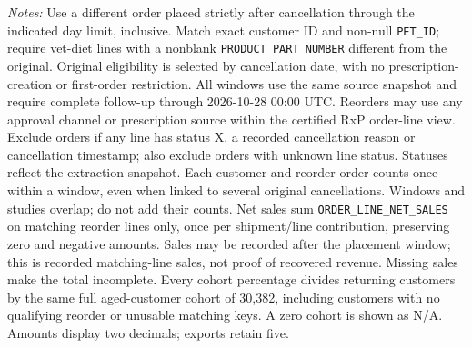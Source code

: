 \begin{table}[!htbp]
\begin{minipage}{\linewidth}
\footnotesize
\textit{Notes:} Use a different order placed strictly after cancellation through the indicated day limit, inclusive. Match exact customer ID and non-null \texttt{PET\_ID}; require vet-diet lines with a nonblank \texttt{PRODUCT\_PART\_NUMBER} different from the original. Original eligibility is selected by
cancellation date, with no prescription-creation or first-order restriction.
All windows use the same source snapshot and require complete follow-up through
2026-10-28 00:00 UTC. Reorders may use any approval channel or prescription
source within the certified RxP order-line view. Exclude orders if any line has
status X, a recorded cancellation reason or cancellation timestamp; also exclude
orders with unknown line status. Statuses reflect the extraction snapshot.
Each customer and reorder order counts once within a window, even when linked
to several original cancellations. Windows and studies overlap; do not add their counts.
Net sales sum \texttt{ORDER\_LINE\_NET\_SALES} on matching reorder lines only,
once per shipment/line contribution, preserving zero and negative amounts.
Sales may be recorded after the placement window; this is recorded matching-line
sales, not proof of recovered revenue. Missing sales make the total incomplete.
Every cohort percentage divides returning customers by the same full aged-customer cohort of 30,382, including customers with no qualifying reorder or unusable matching keys. A zero cohort is shown as N/A. Amounts display two decimals; exports retain five.
\end{minipage}
\end{table}
